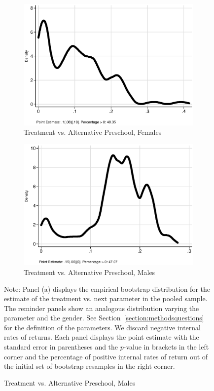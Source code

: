 \begin{figure}
\begin{subfigure}[h]{0.25\textwidth}
\end{subfigure}%
\begin{subfigure}[h]{0.25\textwidth}
	\centering
	\caption{Treatment vs. Alternative Preschool, Females}
		\includegraphics[width=\textwidth]{output/irr_8_sexf.eps}
\end{subfigure}%
\begin{subfigure}[h]{0.25\textwidth}
	\centering
	\caption{Treatment vs. Alternative Preschool, Males}
		\includegraphics[width=\textwidth]{output/irr_8_sexm.eps}
\end{subfigure}
\footnotesize \justify
Note: Panel (a) displays the empirical bootstrap distribution for the estimate of the treatment vs. next parameter in the pooled sample. The reminder panels show an analogous distribution varying the parameter and the gender. See Section~\ref{section:methodsquestions} for the definition of the parameters. We discard negative internal rates of returns. Each panel displays the point estimate with the standard error in parentheses and the $p$-value in brackets in the left corner and the percentage of positive internal rates of return out of the initial set of bootstrap resamples in the right corner.
\end{figure}
\restoregeometry
\doublespacing



